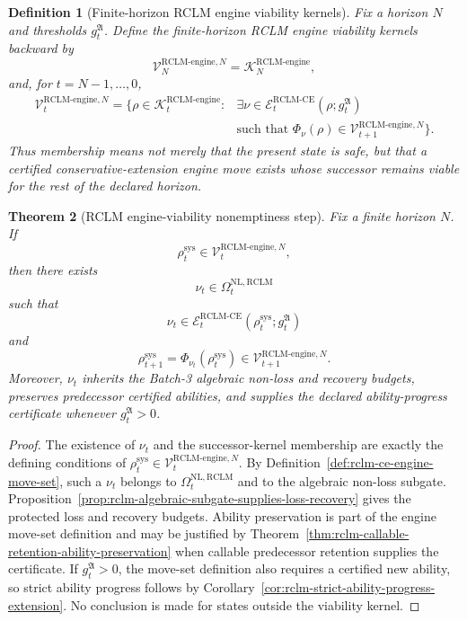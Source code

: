 \documentclass[11pt,a4paper]{article}
\newtheorem{theorem}{Theorem}[section]
\newtheorem{definition}[theorem]{Definition}
\newcommand{\Kcal}{\mathcal K}
\newcommand{\Vcal}{\mathcal V}
\newcommand{\RCLM}{\mathrm{RCLM}}
\newcommand{\sys}{\mathrm{sys}}
\newcommand{\engine}{\mathrm{engine}}
\newcommand{\NL}{\mathrm{NL}}
\newcommand{\CE}{\mathrm{CE}}
\begin{document}
\begin{definition}[Finite-horizon RCLM engine viability kernels]
\label{def:rclm-finite-engine-viability-kernels}
Fix a horizon \(N\) and thresholds \(g_t^{\mathfrak A}\).  Define the finite-horizon RCLM engine viability kernels backward by
\[
\Vcal_N^{\RCLM\text{-}\engine,N}=\Kcal_N^{\RCLM\text{-}\engine},
\]
and, for \(t=N-1,\ldots,0\),
\[
\begin{aligned}
\Vcal_t^{\RCLM\text{-}\engine,N}
=
\{\rho\in\Kcal_t^{\RCLM\text{-}\engine}:{}&
\exists\nu\in\mathcal E_t^{\RCLM\text{-}\CE}(\rho;g_t^{\mathfrak A})\\
&\text{such that }\Phi_\nu(\rho)
\in\Vcal_{t+1}^{\RCLM\text{-}\engine,N}\}.
\end{aligned}
\]
Thus membership means not merely that the present state is safe, but that a certified conservative-extension engine move exists whose successor remains viable for the rest of the declared horizon.
\end{definition}

\begin{theorem}[RCLM engine-viability nonemptiness step]
\label{thm:rclm-engine-viability-nonemptiness-step}
Fix a finite horizon \(N\).  If
\[
\rho_t^{\sys}\in\Vcal_t^{\RCLM\text{-}\engine,N},
\]
then there exists
\[
\nu_t\in\Omega_t^{\NL,\RCLM}
\]
such that
\[
\nu_t\in\mathcal E_t^{\RCLM\text{-}\CE}(\rho_t^{\sys};g_t^{\mathfrak A})
\]
and
\[
\rho_{t+1}^{\sys}=
\Phi_{\nu_t}(\rho_t^{\sys})
\in
\Vcal_{t+1}^{\RCLM\text{-}\engine,N}.
\]
Moreover, \(\nu_t\) inherits the Batch-3 algebraic non-loss and recovery budgets, preserves predecessor certified abilities, and supplies the declared ability-progress certificate whenever \(g_t^{\mathfrak A}>0\).
\end{theorem}

\begin{proof}
The existence of \(\nu_t\) and the successor-kernel membership are exactly the defining conditions of \(\rho_t^{\sys}\in\Vcal_t^{\RCLM\text{-}\engine,N}\).  By Definition~\ref{def:rclm-ce-engine-move-set}, such a \(\nu_t\) belongs to \(\Omega_t^{\NL,\RCLM}\) and to the algebraic non-loss subgate.  Proposition~\ref{prop:rclm-algebraic-subgate-supplies-loss-recovery} gives the protected loss and recovery budgets.  Ability preservation is part of the engine move-set definition and may be justified by Theorem~\ref{thm:rclm-callable-retention-ability-preservation} when callable predecessor retention supplies the certificate.  If \(g_t^{\mathfrak A}>0\), the move-set definition also requires a certified new ability, so strict ability progress follows by Corollary~\ref{cor:rclm-strict-ability-progress-extension}.  No conclusion is made for states outside the viability kernel.
\end{proof}
\end{document}

